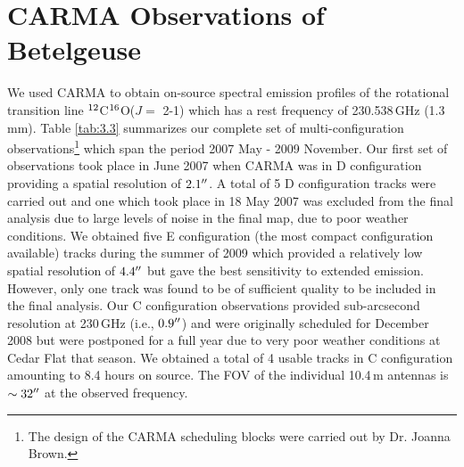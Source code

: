 \section{CARMA Observations of Betelgeuse}\label{sec:3.3}
We used CARMA to obtain on-source spectral emission profiles of the rotational transition line $\rm{{}^{12}}$C$\rm{{}^{16}}$O($J=$ 2-1) which has a rest frequency of 230.538\,GHz (1.3\,mm). Table \ref{tab:3.3} summarizes our complete set of multi-configuration observations\footnote{The design of the CARMA scheduling blocks were carried out by Dr. Joanna Brown.} which span the period 2007 May - 2009 November. Our first set of observations took place in June 2007 when CARMA was in D configuration providing a spatial resolution of $2.1^{\prime\prime}$. A total of 5 D configuration tracks were carried out and one which took place in 18 May 2007 was excluded from the final analysis due to large levels of noise in the final map, due to poor weather conditions. We obtained five E configuration (the most compact configuration available) tracks during the summer of 2009  which provided a relatively low spatial resolution of $4.4^{\prime\prime}$ but gave the best sensitivity to extended emission. However, only one track was found to be of sufficient quality to be included in the final analysis. Our C configuration observations provided sub-arcsecond resolution at 230\,GHz (i.e., $0.9^{\prime\prime}$) and were originally scheduled for December 2008 but were postponed for a full year due to very poor weather conditions at  Cedar Flat that season. We obtained a total of 4 usable tracks in C configuration amounting to 8.4 hours on source. The FOV of the individual 10.4\,m antennas is $\sim 32^{\prime\prime}$ at the observed frequency.

